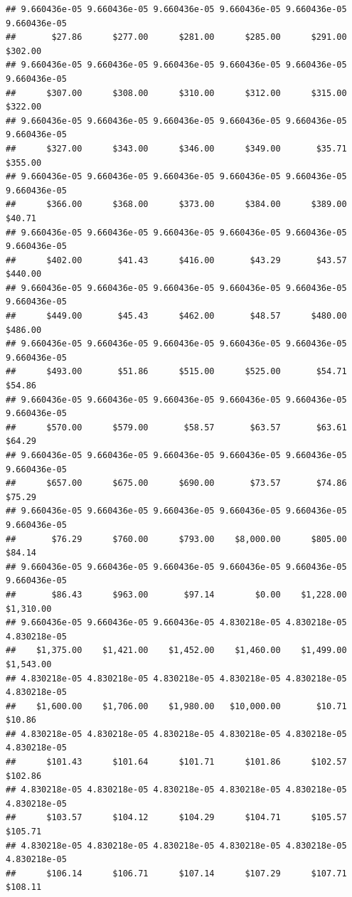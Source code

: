 \begin{verbatim}
## 9.660436e-05 9.660436e-05 9.660436e-05 9.660436e-05 9.660436e-05 9.660436e-05 
##       $27.86      $277.00      $281.00      $285.00      $291.00      $302.00 
## 9.660436e-05 9.660436e-05 9.660436e-05 9.660436e-05 9.660436e-05 9.660436e-05 
##      $307.00      $308.00      $310.00      $312.00      $315.00      $322.00 
## 9.660436e-05 9.660436e-05 9.660436e-05 9.660436e-05 9.660436e-05 9.660436e-05 
##      $327.00      $343.00      $346.00      $349.00       $35.71      $355.00 
## 9.660436e-05 9.660436e-05 9.660436e-05 9.660436e-05 9.660436e-05 9.660436e-05 
##      $366.00      $368.00      $373.00      $384.00      $389.00       $40.71 
## 9.660436e-05 9.660436e-05 9.660436e-05 9.660436e-05 9.660436e-05 9.660436e-05 
##      $402.00       $41.43      $416.00       $43.29       $43.57      $440.00 
## 9.660436e-05 9.660436e-05 9.660436e-05 9.660436e-05 9.660436e-05 9.660436e-05 
##      $449.00       $45.43      $462.00       $48.57      $480.00      $486.00 
## 9.660436e-05 9.660436e-05 9.660436e-05 9.660436e-05 9.660436e-05 9.660436e-05 
##      $493.00       $51.86      $515.00      $525.00       $54.71       $54.86 
## 9.660436e-05 9.660436e-05 9.660436e-05 9.660436e-05 9.660436e-05 9.660436e-05 
##      $570.00      $579.00       $58.57       $63.57       $63.61       $64.29 
## 9.660436e-05 9.660436e-05 9.660436e-05 9.660436e-05 9.660436e-05 9.660436e-05 
##      $657.00      $675.00      $690.00       $73.57       $74.86       $75.29 
## 9.660436e-05 9.660436e-05 9.660436e-05 9.660436e-05 9.660436e-05 9.660436e-05 
##       $76.29      $760.00      $793.00    $8,000.00      $805.00       $84.14 
## 9.660436e-05 9.660436e-05 9.660436e-05 9.660436e-05 9.660436e-05 9.660436e-05 
##       $86.43      $963.00       $97.14        $0.00    $1,228.00    $1,310.00 
## 9.660436e-05 9.660436e-05 9.660436e-05 4.830218e-05 4.830218e-05 4.830218e-05 
##    $1,375.00    $1,421.00    $1,452.00    $1,460.00    $1,499.00    $1,543.00 
## 4.830218e-05 4.830218e-05 4.830218e-05 4.830218e-05 4.830218e-05 4.830218e-05 
##    $1,600.00    $1,706.00    $1,980.00   $10,000.00       $10.71       $10.86 
## 4.830218e-05 4.830218e-05 4.830218e-05 4.830218e-05 4.830218e-05 4.830218e-05 
##      $101.43      $101.64      $101.71      $101.86      $102.57      $102.86 
## 4.830218e-05 4.830218e-05 4.830218e-05 4.830218e-05 4.830218e-05 4.830218e-05 
##      $103.57      $104.12      $104.29      $104.71      $105.57      $105.71 
## 4.830218e-05 4.830218e-05 4.830218e-05 4.830218e-05 4.830218e-05 4.830218e-05 
##      $106.14      $106.71      $107.14      $107.29      $107.71      $108.11 

\end{verbatim}
